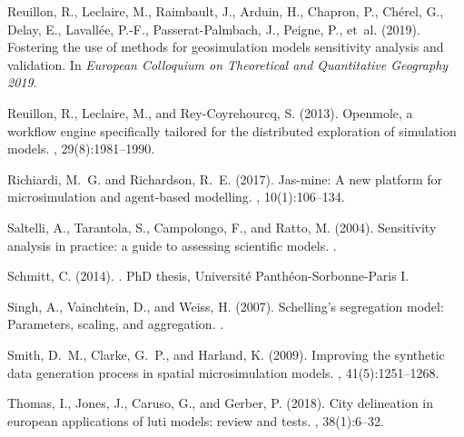 \documentclass[11pt]{article}
\begin{document}
\begin{thebibliography}{}
Reuillon, R., Leclaire, M., Raimbault, J., Arduin, H., Chapron, P., Ch{\'e}rel,
  G., Delay, E., Lavall{\'e}e, P.-F., Passerat-Palmbach, J., Peigne, P., et~al.
  (2019).
\newblock Fostering the use of methods for geosimulation models sensitivity
  analysis and validation.
\newblock In {\em European Colloquium on Theoretical and Quantitative Geography
  2019}.

Reuillon, R., Leclaire, M., and Rey-Coyrehourcq, S. (2013).
\newblock Openmole, a workflow engine specifically tailored for the distributed
  exploration of simulation models.
, 29(8):1981--1990.

Richiardi, M.~G. and Richardson, R.~E. (2017).
\newblock Jas-mine: A new platform for microsimulation and agent-based
  modelling.
, 10(1):106--134.

Saltelli, A., Tarantola, S., Campolongo, F., and Ratto, M. (2004).
\newblock Sensitivity analysis in practice: a guide to assessing scientific
  models.
.

Schmitt, C. (2014).
.
\newblock PhD thesis, Universit{\'e} Panth{\'e}on-Sorbonne-Paris I.

Singh, A., Vainchtein, D., and Weiss, H. (2007).
\newblock Schelling's segregation model: Parameters, scaling, and aggregation.
.

Smith, D.~M., Clarke, G.~P., and Harland, K. (2009).
\newblock Improving the synthetic data generation process in spatial
  microsimulation models.
, 41(5):1251--1268.

Thomas, I., Jones, J., Caruso, G., and Gerber, P. (2018).
\newblock City delineation in european applications of luti models: review and
  tests.
, 38(1):6--32.

\end{thebibliography}
\end{document}
